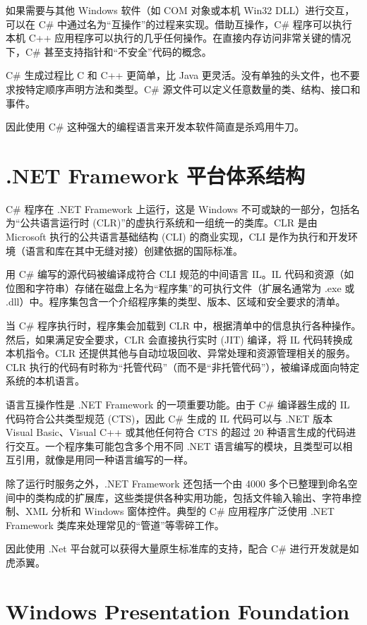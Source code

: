 如果需要与其他 Windows 软件（如 COM 对象或本机 Win32 DLL）进行交互，可以在 C\# 中通过名为``互操作''的过程来实现。借助互操作，C\# 程序可以执行本机 C++ 应用程序可以执行的几乎任何操作。在直接内存访问非常关键的情况下，C\# 甚至支持指针和``不安全''代码的概念。

C\# 生成过程比 C 和 C++ 更简单，比 Java 更灵活。没有单独的头文件，也不要求按特定顺序声明方法和类型。C\# 源文件可以定义任意数量的类、结构、接口和事件。

因此使用 C\# 这种强大的编程语言来开发本软件简直是杀鸡用牛刀。

\section{.NET Framework 平台体系结构}

C\# 程序在 .NET Framework 上运行，这是 Windows 不可或缺的一部分，包括名为``公共语言运行时 (CLR)''的虚执行系统和一组统一的类库。CLR 是由 Microsoft 执行的公共语言基础结构 (CLI) 的商业实现，CLI 是作为执行和开发环境（语言和库在其中无缝对接）创建依据的国际标准。

用 C\# 编写的源代码被编译成符合 CLI 规范的中间语言 IL。IL 代码和资源（如位图和字符串）存储在磁盘上名为``程序集''的可执行文件（扩展名通常为 .exe 或 .dll）中。程序集包含一个介绍程序集的类型、版本、区域和安全要求的清单。

当 C\# 程序执行时，程序集会加载到 CLR 中，根据清单中的信息执行各种操作。然后，如果满足安全要求，CLR 会直接执行实时 (JIT) 编译，将 IL 代码转换成本机指令。CLR 还提供其他与自动垃圾回收、异常处理和资源管理相关的服务。CLR 执行的代码有时称为``托管代码''（而不是``非托管代码''），被编译成面向特定系统的本机语言。

语言互操作性是 .NET Framework 的一项重要功能。由于 C\# 编译器生成的 IL 代码符合公共类型规范 (CTS)，因此 C\# 生成的 IL 代码可以与 .NET 版本 Visual Basic、Visual C++ 或其他任何符合 CTS 的超过 20 种语言生成的代码进行交互。一个程序集可能包含多个用不同 .NET 语言编写的模块，且类型可以相互引用，就像是用同一种语言编写的一样。

除了运行时服务之外，.NET Framework 还包括一个由 4000 多个已整理到命名空间中的类构成的扩展库，这些类提供各种实用功能，包括文件输入输出、字符串控制、XML 分析和 Windows 窗体控件。典型的 C\# 应用程序广泛使用 .NET Framework 类库来处理常见的``管道''等零碎工作。

因此使用 .Net 平台就可以获得大量原生标准库的支持，配合 C\# 进行开发就是如虎添翼。

\section{Windows Presentation Foundation}

